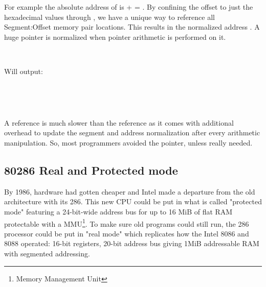 \documentclass[book.tex]{subfiles}
\begin{document}
\par
For example the absolute address of  is  +  = . By confining the offset to just the hexadecimal values  through , we have a unique way to reference all Segment:Offset memory pair locations. This results in the normalized address . A huge pointer is normalized when pointer arithmetic is performed on it. \\
\par
\begin{minipage}{\textwidth}
 \par
 \end{minipage}\\
\par
Will output:\\
\par
\begin{minipage}{\textwidth}
 \par
 \end{minipage}\\
\par


\\

\par
A  reference is much slower than the  reference as it comes with additional overhead to update the segment and address normalization after every arithmetic manipulation. So, most programmers avoided the  pointer, unless really needed.\\

\subsection{80286 Real and Protected mode}
By 1986, hardware had gotten cheaper and Intel made a departure from the old architecture
with its 286. This new CPU could be put in what is called "protected mode" featuring
a 24-bit-wide address bus for up to 16 MiB of flat RAM protectable with a MMU\footnote{Memory Management Unit}. To make sure old programs could still run, the 286 processor could be put in "real mode" which replicates how the Intel 8086 and 8088 operated: 16-bit registers, 20-bit address bus giving 1MiB addressable RAM with segmented addressing.\\
\end{document}
